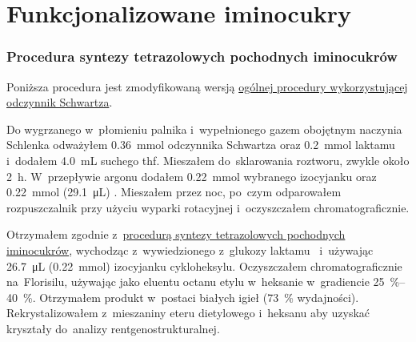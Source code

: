 \section{Funkcjonalizowane iminocukry}\label{experimental:iminosugars}
\subsubsection{Procedura syntezy tetrazolowych pochodnych iminocukrów}\label{experimental:sugars:schwartz}
Poniższa procedura jest zmodyfikowaną wersją \hyperref[experimental:activation:schwartz]{%
	ogólnej procedury wykorzystującej odczynnik Schwartza}.

Do wygrzanego w~płomieniu palnika i~wypełnionego gazem obojętnym naczynia Schlenka odważyłem
\SI{0.36}{\mmol} odczynnika Schwartza oraz \SI{0.2}{\mmol} laktamu i~dodałem \SI{4.0}{\mL} suchego \gls{thf}.
Mieszałem do~sklarowania roztworu, zwykle około \SI{2}{\hour}.
W~przepływie argonu dodałem \SI{0.22}{\mmol} wybranego izocyjanku oraz \SI{0.22}{\mmol} (\SI{29.1}{\micro\liter}) .
Mieszałem przez noc, po~czym odparowałem rozpuszczalnik przy użyciu wyparki rotacyjnej
	i~oczyszczałem chromatograficznie.

Otrzymałem zgodnie z~\hyperref[experimental:sugars:schwartz]{procedurą syntezy tetrazolowych
	pochodnych iminocukrów}, wychodząc z~wywiedzionego z~glukozy laktamu~
	i~używając \SI{26.7}{\micro\liter} (\SI{0.22}{\milli\mol}) izocyjanku cykloheksylu.
Oczyszczałem chromatograficznie na~Florisilu\textsuperscript{\textregistered},
	używając jako eluentu octanu etylu w~heksanie w~gradiencie \SIrange{25}{40}{\percent}.
Otrzymałem produkt w~postaci białych igieł (\SI{73}{\percent} wydajności).
Rekrystalizowałem z~mieszaniny eteru dietylowego i~heksanu aby uzyskać kryształy
	do~analizy rentgenostrukturalnej.


